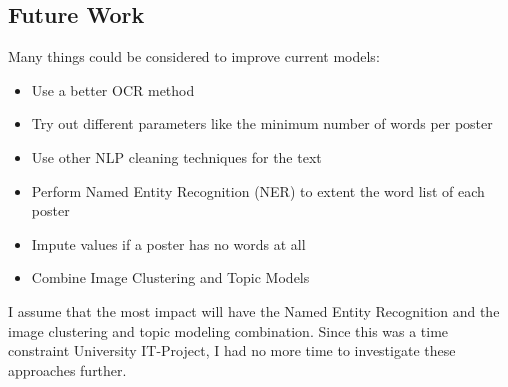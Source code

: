 \documentclass[conference]{IEEEtran}
\begin{document}
\subsection{Future Work}

Many things could be considered to improve current models:

\begin{itemize}
\item Use a better OCR method
\item Try out different parameters like the minimum number of words per poster
\item Use other NLP cleaning techniques for the text
\item Perform Named Entity Recognition (NER) to extent the word list of each poster
\item Impute values if a poster has no words at all
\item Combine Image Clustering and Topic Models
\end{itemize}

I assume that the most impact will have the Named Entity Recognition and the image clustering and topic modeling combination. Since this was a time constraint University IT-Project, I had no more time to investigate these approaches further.

\renewcommand{\refname}{References}

\end{document}
